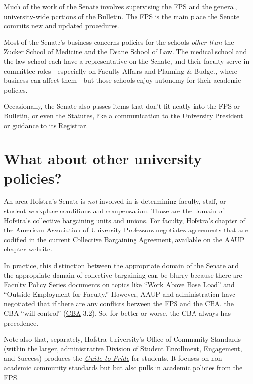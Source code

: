 \documentclass[12pt]{article}
\begin{document}
Much of the work of the Senate involves supervising the FPS and the
general, university-wide portions of the Bulletin. The FPS is the main
place the Senate commits new and updated procedures.

Most of the Senate's business concerns policies for the schools
\emph{other than} the Zucker School of Medicine and the Deane School of
Law. The medical school and the law school each have a representative on
the Senate, and their faculty serve in committee roles---especially on
Faculty Affairs and Planning \& Budget, where business can affect
them---but those schools enjoy autonomy for their academic policies.

Occasionally, the Senate also passes items that don't fit neatly into
the FPS or Bulletin, or even the Statutes, like a communication to the
University President or guidance to its Registrar.

\section{What about other university
policies?}\label{what-about-other-university-policies}

An area Hofstra's Senate is \emph{not} involved in is determining
faculty, staff, or student workplace conditions and compensation. Those
are the domain of Hofstra's collective bargaining units and unions. For
faculty, Hofstra's chapter of the American Association of University
Professors negotiates agreements that are codified in the current
\href{https://aaup-hofstra.org}{Collective Bargaining Agreement},
available on the AAUP chapter website.

In practice, this distinction between the appropriate domain of the
Senate and the appropriate domain of collective bargaining can be blurry
because there are Faculty Policy Series documents on topics like ``Work
Above Base Load'' and ``Outside Employment for Faculty.'' However, AAUP
and administration have negotiated that if there are any conflicts
between the FPS and the CBA, the CBA ``will control''
(\href{https://aaup-hofstra.org}{CBA} 3.2). So, for better or worse, the
CBA always has precedence.

Note also that, separately, Hofstra University's Office of Community
Standards (within the larger, administrative Division of Student
Enrollment, Engagement, and Success) produces the
\href{https://sites.google.com/hofstra.edu/guide-to-pride/home}{\emph{Guide
to Pride}} for students. It focuses on non-academic community standards
but but also pulls in academic policies from the FPS.
\end{document}
